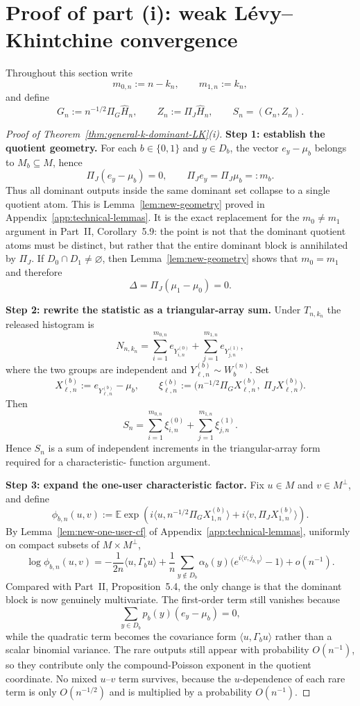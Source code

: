 \documentclass{article}
\newcommand{\E}{\mathbb E}
\newcommand{\1}{\mathbf 1}
\begin{document}
\section{Proof of part (i): weak L\'evy--Khintchine convergence}
\label{sec:proof-i}

Throughout this section write
\[
m_{0,n}:=n-k_n,\qquad m_{1,n}:=k_n,
\]
and define
\[
G_n:=n^{-1/2}\Pi_G\widehat H_n,\qquad Z_n:=\Pi_J\widehat H_n,
\qquad S_n=(G_n,Z_n).
\]

\begin{proof}[Proof of Theorem~\ref{thm:general-k-dominant-LK}(i)]
\textbf{Step 1: establish the quotient geometry.}
For each $b\in\{0,1\}$ and $y\in D_b$, the vector $e_y-\mu_b$ belongs to $M_b\subseteq M$, hence
\[
\Pi_J(e_y-\mu_b)=0,
\qquad \Pi_J e_y=\Pi_J\mu_b=:m_b.
\]
Thus all dominant outputs inside the same dominant set collapse to a single quotient atom. This is
Lemma~\ref{lem:new-geometry} proved in Appendix~\ref{app:technical-lemmas}. It is the exact replacement for the
$m_0\neq m_1$ argument in Part~II, Corollary~5.9: the point is not that the dominant quotient atoms must be
distinct, but rather that the entire dominant block is annihilated by $\Pi_J$. If $D_0\cap D_1\neq\varnothing$, then
Lemma~\ref{lem:new-geometry} shows that $m_0=m_1$ and therefore
\[
\Delta=\Pi_J(\mu_1-\mu_0)=0.
\]

\medskip
\textbf{Step 2: rewrite the statistic as a triangular-array sum.}
Under $T_{n,k_n}$ the released histogram is
\[
N_{n,k_n}=\sum_{i=1}^{m_{0,n}} e_{Y^{(0)}_{i,n}}+\sum_{j=1}^{m_{1,n}} e_{Y^{(1)}_{j,n}},
\]
where the two groups are independent and $Y^{(b)}_{\ell,n}\sim W_b^{(n)}$. Set
\[
X^{(b)}_{\ell,n}:=e_{Y^{(b)}_{\ell,n}}-\mu_b,
\qquad
\xi^{(b)}_{\ell,n}:=\bigl(n^{-1/2}\Pi_G X^{(b)}_{\ell,n},\ \Pi_J X^{(b)}_{\ell,n}\bigr).
\]
Then
\[
S_n=\sum_{i=1}^{m_{0,n}}\xi^{(0)}_{i,n}+\sum_{j=1}^{m_{1,n}}\xi^{(1)}_{j,n}.
\]
Hence $S_n$ is a sum of independent increments in the triangular-array form required for a characteristic-
function argument.

\medskip
\textbf{Step 3: expand the one-user characteristic factor.}
Fix $u\in M$ and $v\in M^\perp$, and define
\[
\phi_{b,n}(u,v)
:=
\E\exp\!\left(
 i\bigl\langle u,n^{-1/2}\Pi_G X^{(b)}_{1,n}\bigr\rangle
 +i\bigl\langle v,\Pi_J X^{(b)}_{1,n}\bigr\rangle
\right).
\]
By Lemma~\ref{lem:new-one-user-cf} of Appendix~\ref{app:technical-lemmas}, uniformly on compact subsets of
$M\times M^\perp$,
\[
\log\phi_{b,n}(u,v)
=
-\frac{1}{2n}\langle u,\Gamma_b u\rangle
+
\frac{1}{n}\sum_{y\notin D_b}\alpha_b(y)\bigl(e^{i\langle v,j_{b,y}\rangle}-1\bigr)
+o(n^{-1}).
\]
Compared with Part~II, Proposition~5.4, the only change is that the dominant block is now genuinely
multivariate. The first-order term still vanishes because
\[
\sum_{y\in D_b} p_b(y)(e_y-\mu_b)=0,
\]
while the quadratic term becomes the covariance form $\langle u,\Gamma_bu\rangle$ rather than a scalar
binomial variance. The rare outputs still appear with probability $O(n^{-1})$, so they contribute only the
compound-Poisson exponent in the quotient coordinate. No mixed $u$--$v$ term survives, because the $u$-dependence
of each rare term is only $O(n^{-1/2})$ and is multiplied by a probability $O(n^{-1})$.


\end{proof}
\end{document}
